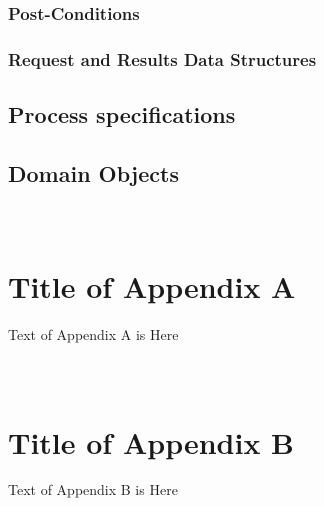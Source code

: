 \documentclass[11pt,titlepage]{article} %
\begin{document}
	\subsubsection{Post-Conditions}

	\subsubsection{Request and Results Data Structures}

\subsection{Process specifications}

\subsection{Domain Objects}



\newpage













\appendix
\section{\\Title of Appendix A} \label{App:AppendixA}

Text of Appendix A is Here

\newpage
\section{\\Title of Appendix B} \label{App:AppendixB}

Text of Appendix B is Here

\newpage
\begin{thebibliography}{10}


\end{thebibliography}
\end{document}
